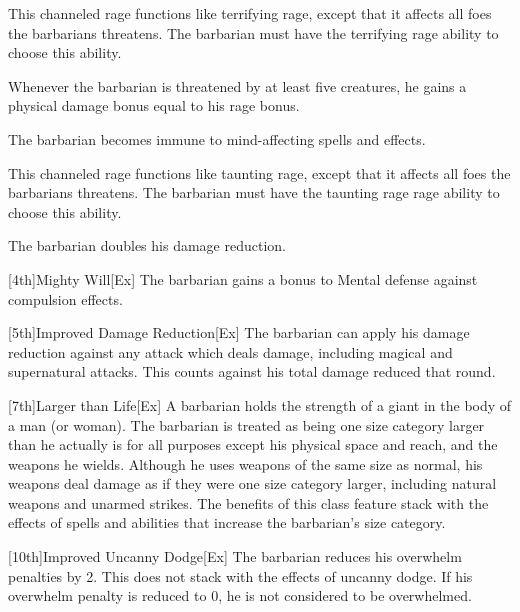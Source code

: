 This channeled rage functions like terrifying rage, except that it affects all foes the barbarians threatens.
The barbarian must have the terrifying rage ability to choose this ability.

Whenever the barbarian is threatened by at least five creatures, he gains a physical damage bonus equal to his rage bonus.

The barbarian becomes immune to mind-affecting spells and effects.

This channeled rage functions like taunting rage, except that it affects all foes the barbarians threatens.
The barbarian must have the taunting rage rage ability to choose this ability.


The barbarian doubles his damage reduction.

[4th]{Mighty Will}[Ex]
The barbarian gains a  bonus to Mental defense against compulsion effects.

[5th]{Improved Damage Reduction}[Ex]
The barbarian can apply his damage reduction against any attack which deals damage, including magical and supernatural attacks.
This counts against his total damage reduced that round.

[7th]{Larger than Life}[Ex]
A barbarian holds the strength of a giant in the body of a man (or woman).
The barbarian is treated as being one size category larger than he actually is for all purposes except his physical space and reach, and the weapons he wields.
Although he uses weapons of the same size as normal, his weapons deal damage as if they were one size category larger, including natural weapons and unarmed strikes.
The benefits of this class feature stack with the effects of spells and abilities that increase the barbarian's size category.

[10th]{Improved Uncanny Dodge}[Ex]
The barbarian reduces his overwhelm penalties by 2.
This does not stack with the effects of uncanny dodge.
If his overwhelm penalty is reduced to 0, he is not considered to be overwhelmed.

